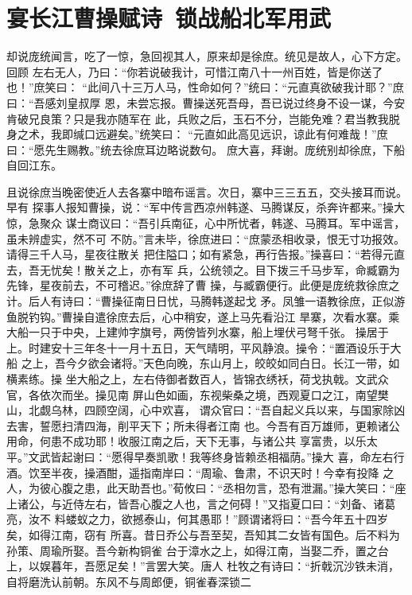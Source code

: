 \chapter{宴长江曹操赋诗~锁战船北军用武}

却说庞统闻言，吃了一惊，急回视其人，原来却是徐庶。统见是故人，心下方定。回顾
左右无人，乃曰：“你若说破我计，可惜江南八十一州百姓，皆是你送了也！”庶笑曰：
“此间八十三万人马，性命如何？”统曰：“元直真欲破我计耶？”庶曰：“吾感刘皇叔厚
恩，未尝忘报。曹操送死吾母，吾已说过终身不设一谋，今安肯破兄良策？只是我亦随军在
此，兵败之后，玉石不分，岂能免难？君当教我脱身之术，我即缄口远避矣。”统笑曰：
“元直如此高见远识，谅此有何难哉！”庶曰：“愿先生赐教。”统去徐庶耳边略说数句。
庶大喜，拜谢。庞统别却徐庶，下船自回江东。

且说徐庶当晚密使近人去各寨中暗布谣言。次日，寨中三三五五，交头接耳而说。早有
探事人报知曹操，说：“军中传言西凉州韩遂、马腾谋反，杀奔许都来。”操大惊，急聚众
谋士商议曰：“吾引兵南征，心中所忧者，韩遂、马腾耳。军中谣言，虽未辨虚实，然不可
不防。”言未毕，徐庶进曰：“庶蒙丞相收录，恨无寸功报效。请得三千人马，星夜往散关
把住隘口；如有紧急，再行告报。”操喜曰：“若得元直去，吾无忧矣！散关之上，亦有军
兵，公统领之。目下拨三千马步军，命臧霸为先锋，星夜前去，不可稽迟。”徐庶辞了曹
操，与臧霸便行。此便是庞统救徐庶之计。后人有诗曰：“曹操征南日日忧，马腾韩遂起戈
矛。凤雏一语教徐庶，正似游鱼脱钓钩。”曹操自遣徐庶去后，心中稍安，遂上马先看沿江
旱寨，次看水寨。乘大船一只于中央，上建帅字旗号，两傍皆列水寨，船上埋伏弓弩千张。
操居于上。时建安十三年冬十一月十五日，天气晴明，平风静浪。操令：“置酒设乐于大船
之上，吾今夕欲会诸将。”天色向晚，东山月上，皎皎如同白日。长江一带，如横素练。操
坐大船之上，左右侍御者数百人，皆锦衣绣袄，荷戈执戟。文武众官，各依次而坐。操见南
屏山色如画，东视柴桑之境，西观夏口之江，南望樊山，北觑乌林，四顾空阔，心中欢喜，
谓众官曰：“吾自起义兵以来，与国家除凶去害，誓愿扫清四海，削平天下；所未得者江南
也。今吾有百万雄师，更赖诸公用命，何患不成功耶！收服江南之后，天下无事，与诸公共
享富贵，以乐太平。”文武皆起谢曰：“愿得早奏凯歌！我等终身皆赖丞相福荫。”操大
喜，命左右行酒。饮至半夜，操酒酣，遥指南岸曰：“周瑜、鲁肃，不识天时！今幸有投降
之人，为彼心腹之患，此天助吾也。”荀攸曰：“丞相勿言，恐有泄漏。”操大笑曰：“座
上诸公，与近侍左右，皆吾心腹之人也，言之何碍！”又指夏口曰：“刘备、诸葛亮，汝不
料蝼蚁之力，欲撼泰山，何其愚耶！”顾谓诸将曰：“吾今年五十四岁矣，如得江南，窃有
所喜。昔日乔公与吾至契，吾知其二女皆有国色。后不料为孙策、周瑜所娶。吾今新构铜雀
台于漳水之上，如得江南，当娶二乔，置之台上，以娱暮年，吾愿足矣！”言罢大笑。唐人
杜牧之有诗曰：“折戟沉沙铁未消，自将磨洗认前朝。东风不与周郎便，铜雀春深锁二
